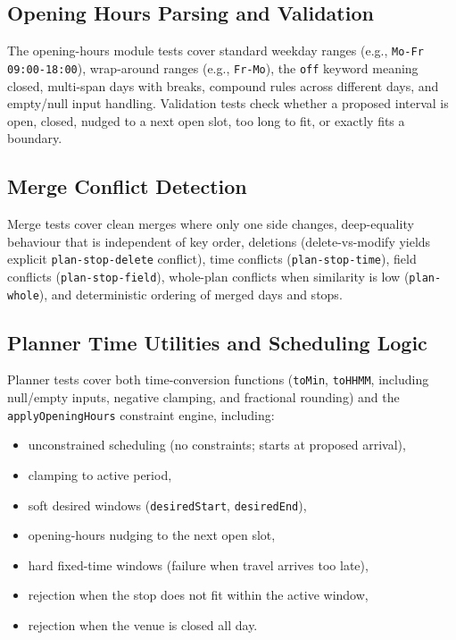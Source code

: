\subsection{Opening Hours Parsing and Validation}
The opening-hours module tests cover standard weekday ranges (e.g., \texttt{Mo-Fr 09:00-18:00}), wrap-around ranges (e.g., \texttt{Fr-Mo}), the \texttt{off} keyword meaning closed, multi-span days with breaks, compound rules across different days, and empty/null input handling. Validation tests check whether a proposed interval is open, closed, nudged to a next open slot, too long to fit, or exactly fits a boundary.

\subsection{Merge Conflict Detection}
Merge tests cover clean merges where only one side changes, deep-equality behaviour that is independent of key order, deletions (delete-vs-modify yields explicit \texttt{plan-stop-delete} conflict), time conflicts (\texttt{plan-stop-time}), field conflicts (\texttt{plan-stop-field}), whole-plan conflicts when similarity is low (\texttt{plan-whole}), and deterministic ordering of merged days and stops.

\subsection{Planner Time Utilities and Scheduling Logic}
Planner tests cover both time-conversion functions (\texttt{toMin},
\texttt{toHHMM}, including null/empty inputs, negative clamping, and fractional
rounding) and the \texttt{applyOpeningHours} constraint engine, including:
\begin{itemize}
  \item unconstrained scheduling (no constraints; starts at proposed arrival),
  \item clamping to active period,
  \item soft desired windows (\texttt{desiredStart}, \texttt{desiredEnd}),
  \item opening-hours nudging to the next open slot,
  \item hard fixed-time windows (failure when travel arrives too late),
  \item rejection when the stop does not fit within the active window,
  \item rejection when the venue is closed all day.
\end{itemize}

